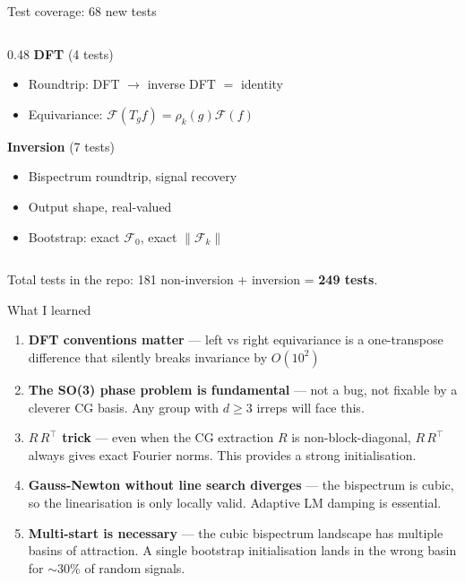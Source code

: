 \documentclass[aspectratio=169]{beamer}
\begin{document}
\begin{frame}{Test coverage: 68 new tests}
\begin{columns}[T]
\begin{column}{0.48\textwidth}
      \textbf{DFT} (4 tests)
      \begin{itemize}\scriptsize
        \item Roundtrip: DFT $\to$ inverse DFT $=$ identity
        \item Equivariance: $\mathcal{F}(T_g f) = \rho_k(g) \mathcal{F}(f)$
      \end{itemize}

      \bigskip

      \textbf{Inversion} (7 tests)
      \begin{itemize}\scriptsize
        \item Bispectrum roundtrip, signal recovery
        \item Output shape, real-valued
        \item Bootstrap: exact $\mathcal{F}_0$, exact $\|\mathcal{F}_k\|$
      \end{itemize}
    \end{column}
  \end{columns}

  \bigskip

  Total tests in the repo: 181 non-inversion + inversion = \textbf{249 tests}.
\end{frame}

\begin{frame}{What I learned}
  \begin{enumerate}
    \item \textbf{DFT conventions matter} --- left vs right equivariance is a one-transpose
          difference that silently breaks invariance by $O(10^2)$

    \smallskip

    \item \textbf{The SO(3) phase problem is fundamental} --- not a bug, not fixable by
          a cleverer CG basis. Any group with $d \geq 3$ irreps will face this.

    \smallskip

    \item \textbf{$R\,R^\top$ trick} --- even when the CG extraction $R$ is non-block-diagonal,
          $R\,R^\top$ always gives exact Fourier norms. This provides a strong initialisation.

    \smallskip

    \item \textbf{Gauss-Newton without line search diverges} --- the bispectrum is cubic,
          so the linearisation is only locally valid. Adaptive LM damping is essential.

    \smallskip

    \item \textbf{Multi-start is necessary} --- the cubic bispectrum landscape has multiple
          basins of attraction. A single bootstrap initialisation lands in the wrong basin
          for ${\sim}30\%$ of random signals.
  \end{enumerate}
\end{frame}
\end{document}
